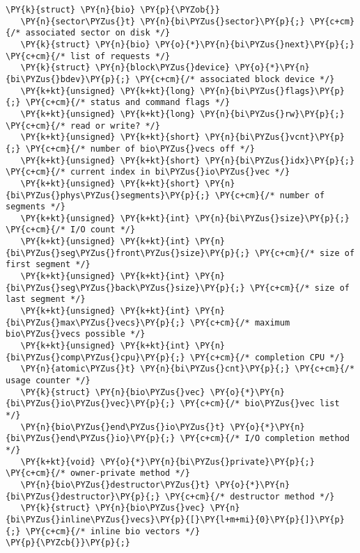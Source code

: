 \begin{Verbatim}[commandchars=\\\{\}]
\PY{k}{struct} \PY{n}{bio} \PY{p}{\PYZob{}}
   \PY{n}{sector\PYZus{}t} \PY{n}{bi\PYZus{}sector}\PY{p}{;} \PY{c+cm}{/* associated sector on disk */}
   \PY{k}{struct} \PY{n}{bio} \PY{o}{*}\PY{n}{bi\PYZus{}next}\PY{p}{;} \PY{c+cm}{/* list of requests */}
   \PY{k}{struct} \PY{n}{block\PYZus{}device} \PY{o}{*}\PY{n}{bi\PYZus{}bdev}\PY{p}{;} \PY{c+cm}{/* associated block device */}
   \PY{k+kt}{unsigned} \PY{k+kt}{long} \PY{n}{bi\PYZus{}flags}\PY{p}{;} \PY{c+cm}{/* status and command flags */}
   \PY{k+kt}{unsigned} \PY{k+kt}{long} \PY{n}{bi\PYZus{}rw}\PY{p}{;} \PY{c+cm}{/* read or write? */}
   \PY{k+kt}{unsigned} \PY{k+kt}{short} \PY{n}{bi\PYZus{}vcnt}\PY{p}{;} \PY{c+cm}{/* number of bio\PYZus{}vecs off */}
   \PY{k+kt}{unsigned} \PY{k+kt}{short} \PY{n}{bi\PYZus{}idx}\PY{p}{;} \PY{c+cm}{/* current index in bi\PYZus{}io\PYZus{}vec */}
   \PY{k+kt}{unsigned} \PY{k+kt}{short} \PY{n}{bi\PYZus{}phys\PYZus{}segments}\PY{p}{;} \PY{c+cm}{/* number of segments */}
   \PY{k+kt}{unsigned} \PY{k+kt}{int} \PY{n}{bi\PYZus{}size}\PY{p}{;} \PY{c+cm}{/* I/O count */}
   \PY{k+kt}{unsigned} \PY{k+kt}{int} \PY{n}{bi\PYZus{}seg\PYZus{}front\PYZus{}size}\PY{p}{;} \PY{c+cm}{/* size of first segment */}
   \PY{k+kt}{unsigned} \PY{k+kt}{int} \PY{n}{bi\PYZus{}seg\PYZus{}back\PYZus{}size}\PY{p}{;} \PY{c+cm}{/* size of last segment */}
   \PY{k+kt}{unsigned} \PY{k+kt}{int} \PY{n}{bi\PYZus{}max\PYZus{}vecs}\PY{p}{;} \PY{c+cm}{/* maximum bio\PYZus{}vecs possible */}
   \PY{k+kt}{unsigned} \PY{k+kt}{int} \PY{n}{bi\PYZus{}comp\PYZus{}cpu}\PY{p}{;} \PY{c+cm}{/* completion CPU */}
   \PY{n}{atomic\PYZus{}t} \PY{n}{bi\PYZus{}cnt}\PY{p}{;} \PY{c+cm}{/* usage counter */}
   \PY{k}{struct} \PY{n}{bio\PYZus{}vec} \PY{o}{*}\PY{n}{bi\PYZus{}io\PYZus{}vec}\PY{p}{;} \PY{c+cm}{/* bio\PYZus{}vec list */}
   \PY{n}{bio\PYZus{}end\PYZus{}io\PYZus{}t} \PY{o}{*}\PY{n}{bi\PYZus{}end\PYZus{}io}\PY{p}{;} \PY{c+cm}{/* I/O completion method */}
   \PY{k+kt}{void} \PY{o}{*}\PY{n}{bi\PYZus{}private}\PY{p}{;} \PY{c+cm}{/* owner-private method */}
   \PY{n}{bio\PYZus{}destructor\PYZus{}t} \PY{o}{*}\PY{n}{bi\PYZus{}destructor}\PY{p}{;} \PY{c+cm}{/* destructor method */}
   \PY{k}{struct} \PY{n}{bio\PYZus{}vec} \PY{n}{bi\PYZus{}inline\PYZus{}vecs}\PY{p}{[}\PY{l+m+mi}{0}\PY{p}{]}\PY{p}{;} \PY{c+cm}{/* inline bio vectors */}
\PY{p}{\PYZcb{}}\PY{p}{;}
\end{Verbatim}
